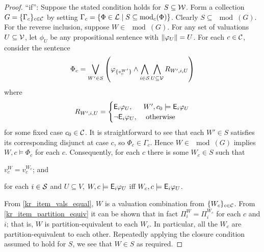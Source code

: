 \begin{proof}
    ``if'': Suppose the stated condition holds for $S \subseteq \mathcal{W}$. Form a
    collection $G = \{\Gamma_c\}_{c \in \mathcal{C}}$ by setting $\Gamma_c = \{\Phi \in
    \mathcal{L}{} \mid S \subseteq \operatorname{mod}_c(\Phi)\}$. Clearly $S \subseteq \mod(G)$. For the
    reverse inclusion, suppose $W \in \mod(G)$. For any set of valuations $U
    \subseteq \mathcal{V}$, let $\phi_U$ be any propositional sentence with
    $\|{\varphi_U}\| = U$. For each $c \in \mathcal{C}$, consider the sentence
    \[
        \Phi_c = \bigvee_{W' \in S}\left(
            \varphi_{\{v^{W'}_c\}}
            \land
            \bigwedge_{i \in \mathcal{S}}
                \bigwedge_{U \subseteq \mathcal{V}}
                    R_{W', i, U}
        \right)
    \]
    where
    \[
        R_{W', i, U} = \begin{cases}
            \mathsf{E}_i{\varphi_U},& W', c_0 \models \mathsf{E}_i{\varphi_U} \\
            \neg \mathsf{E}_i{\varphi_U},& \text{ otherwise }
        \end{cases}
    \]
    for some fixed case $c_0 \in \mathcal{C}$. It is straightforward to see that each
    $W' \in S$ satisfies its corresponding disjunct at case $c$, so $\Phi_c \in
    \Gamma_c$. Hence $W \in \mod(G)$ implies $W, c \models \Phi_c$ for each $c$.
    Consequently, for each $c$ there is some $W_c \in S$ such that
    \begin{inlinelist}
        \item \label{kr_item_vals_equal} $v^W_c = v^{W_c}_c$; and
        \item \label{kr_item_partition_equiv} for each $i \in \mathcal{S}$ and $U \subseteq
              V$, $W, c \models \mathsf{E}_i{\varphi_U}$ iff $W_c, c \models \mathsf{E}_i{\varphi_U}$.
    \end{inlinelist}
    From \ref{kr_item_vals_equal}, $W$ is a valuation combination from $\{W_c\}_{c
    \in \mathcal{C}}$. From \ref{kr_item_partition_equiv} it can be shown that in fact
    $\Pi^W_i = \Pi^{W_c}_i$ for each $c$ and $i$; that is, $W$ is
    partition-equivalent to each $W_c$. In particular, all the $W_c$ are
    partition-equivalent to each other.
    Repeatedly applying the closure condition assumed to hold for $S$, we see
    that $W \in S$ as required.


\end{proof}

